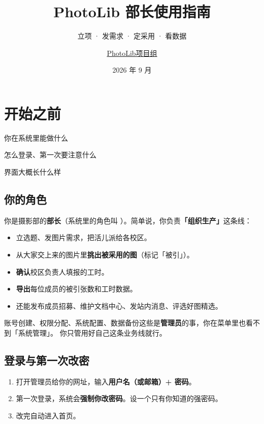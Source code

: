 \documentclass[cn,11pt,green]{elegantbook}
\title{PhotoLib 部长使用指南}
\subtitle{立项 · 发需求 · 定采用 · 看数据}
\author{\href{mailto:i@liujr.uk}{PhotoLib项目组}}
\institute{校园摄影部图片工作站}
\date{2026 年 9 月}
\begin{document}
\maketitle
\frontmatter
\tableofcontents
\mainmatter

\chapter{开始之前}

\begin{introduction}
  \item 你在系统里能做什么
  \item 怎么登录、第一次要注意什么
  \item 界面大概长什么样
\end{introduction}

\section{你的角色}

你是摄影部的\textbf{部长}（系统里的角色叫 ）。简单说，你负责\textbf{「组织生产」}这条线：

\begin{itemize}
  \item 立选题、发图片需求，把活儿派给各校区。
  \item 从大家交上来的图片里\textbf{挑出被采用的图}（标记「被引」）。
  \item \textbf{确认}校区负责人填报的工时。
  \item \textbf{导出}每位成员的被引张数和工时数据。
  \item 还能发布成员招募、维护文档中心、发站内消息、评选好图精选。
\end{itemize}

\begin{notebox}[你不需要操心的事]
  账号创建、权限分配、系统配置、数据备份这些是\textbf{管理员}的事，你在菜单里也看不到「系统管理」。
  你只管用好自己这条业务线就行。
\end{notebox}

\section{登录与第一次改密}

\begin{stepbox}[第一次登录]
  \begin{enumerate}
    \item 打开管理员给你的网址，输入\textbf{用户名（或邮箱）+ 密码}。
    \item 第一次登录，系统会\textbf{强制你改密码}。设一个只有你知道的强密码。
    \item 改完自动进入首页。
  \end{enumerate}
\end{stepbox}
\end{document}
